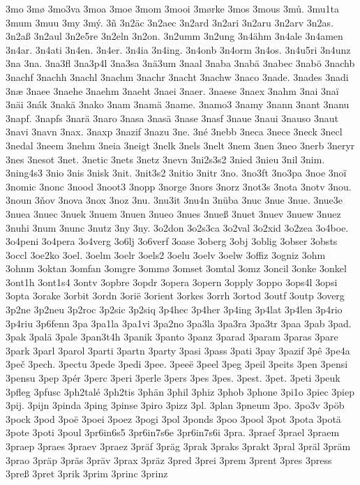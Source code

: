 3mo
3mø
3mo3va
3moa
3moe
3mom
3mooi
3mørke
3mos
3mous
3mů.
3mu1ta
3mum
3muu
3my
3mý.
3ñ
3n2äc
3n2aec
3n2ard
3n2ari
3n2aru
3n2arv
3n2as.
3n2aß
3n2aul
3n2e5re
3n2eln
3n2on.
3n2umm
3n2ung
3n4ähm
3n4ale
3n4amen
3n4ar.
3n4ati
3n4en.
3n4er.
3n4ia
3n4ing.
3n4onb
3n4orm
3n4os.
3n4u5ri
3n4unz
3na
3na.
3na3fl
3na3p4l
3na3sa
3nä3um
3naal
3naba
3nabä
3nabec
3nabö
3nachb
3nachf
3nachh
3nachl
3nachm
3nachr
3nacht
3nachw
3naco
3nade.
3nades
3nadi
3næ
3naee
3naehe
3naehm
3naeht
3naei
3naer.
3naese
3naex
3nahm
3nai
3naï
3näi
3nák
3nakä
3nako
3nam
3namä
3name.
3namo3
3namy
3nann
3nant
3nanu
3napf.
3napfs
3narä
3naro
3nasa
3nasä
3nase
3nasf
3naue
3naui
3nauso
3naut
3navi
3navn
3nax.
3naxp
3nazif
3nazu
3ne.
3né
3nebb
3neca
3nece
3neck
3necl
3nedal
3neem
3nehm
3neia
3neigt
3nelk
3nels
3nelt
3nem
3nen
3neo
3nerb
3neryr
3nes
3nesot
3net.
3netic
3nets
3netz
3nevn
3ni2s3s2
3nied
3nieu
3nil
3nim.
3ning4s3
3nio
3nis
3nisk
3nit.
3nit3s2
3nitio
3nitr
3no.
3no3ft
3no3pa
3noe
3noï
3nomic
3nonc
3nood
3noot3
3nopp
3norge
3nors
3norz
3not3s
3nota
3notv
3nou.
3noun
3ňov
3nova
3nox
3noz
3nu.
3nu3it
3nu4n
3nüba
3nuc
3nue
3nue.
3nue3e
3nuea
3nuec
3nuek
3nuem
3nuen
3nueo
3nues
3nueß
3nuet
3nuev
3nuew
3nuez
3nuhi
3num
3nunc
3nutz
3ny
3ny.
3o2don
3o2s3ca
3o2val
3o2xid
3o2zea
3o4boe.
3o4peni
3o4pera
3o4verg
3o6lj
3o6verf
3oase
3oberg
3obj
3oblig
3obser
3obsts
3occl
3oe2ko
3oel.
3oelm
3oelr
3oels2
3oelu
3oelv
3oelw
3offiz
3ogniz
3ohm
3ohnm
3oktan
3omfan
3omgre
3ommø
3omset
3omtal
3omz
3oncil
3onke
3onkel
3ont1h
3ont1s4
3ontv
3opbre
3opdr
3opera
3opern
3opply
3oppo
3ops4l
3opsi
3opta
3orake
3orbit
3ordn
3orië
3orient
3orkes
3orrh
3ortod
3outf
3outp
3overg
3p2ne
3p2neu
3p2roc
3p2sic
3p2siq
3p4hec
3p4her
3p4ing
3p4lat
3p4len
3p4rio
3p4riu
3p6fenn
3pa
3pa1la
3pa1vi
3pa2no
3pa3la
3pa3ra
3pa3tr
3paa
3pab
3pad.
3pak
3palä
3pale
3pan3t4h
3panik
3panto
3panz
3parad
3param
3paras
3pare
3park
3parl
3parol
3parti
3partn
3party
3pasi
3pass
3pati
3pay
3pazif
3pê
3pe4a
3peč
3pech.
3pectu
3pede
3pedi
3pee.
3peeë
3peel
3peg
3peil
3peits
3pen
3pensi
3pensu
3pep
3pér
3perc
3peri
3perle
3pers
3pes
3pes.
3pest.
3pet.
3peti
3peuk
3pfleg
3pfusc
3ph2talé
3ph2tis
3phän
3phil
3phiz
3phob
3phone
3pi1o
3piec
3piep
3pij.
3pijn
3pinda
3ping
3pinse
3piro
3pizz
3pl.
3plan
3pneum
3po.
3po3v
3pöb
3pock
3pod
3poë
3poei
3poez
3pogi
3pol
3ponds
3poo
3pool
3pot
3pota
3potä
3pote
3poti
3poul
3pr6in6s5
3pr6in7s6e
3pr6in7s6i
3pra.
3praef
3prael
3praem
3praep
3praes
3praev
3praez
3präf
3präg
3prak
3praks
3prakt
3pral
3präl
3präm
3prao
3präp
3präs
3präv
3prax
3präz
3pred
3prei
3prem
3prent
3pres
3press
3preß
3pret
3prik
3prim
3princ
3prinz

